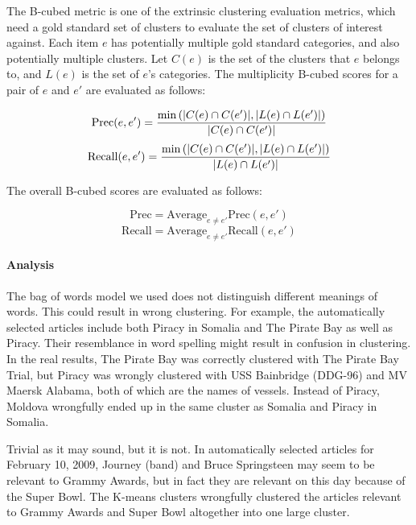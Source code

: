 \documentclass[11pt]{article}
\newcommand{\war}[1]{{\sf\small #1}}
\begin{document}
The B-cubed metric is one of the extrinsic clustering evaluation metrics, which need a gold standard set of clusters to evaluate the set of clusters of interest against.
Each item $e$ has potentially multiple gold standard categories, and also potentially multiple clusters.
Let $C(e)$ is the set of the clusters that $e$ belongs to, and $L(e)$ is the set of $e$'s categories.
The multiplicity B-cubed scores for a pair of $e$ and $e'$ are evaluated as follows:

$$ \mbox{Prec}(e,e') = { \min \left( |C(e) \cap C(e')| , |L(e) \cap L(e')| \right) \over |C(e) \cap C(e')| } $$
$$ \mbox{Recall}(e,e') = { \min \left( |C(e) \cap C(e')| , |L(e) \cap L(e')| \right) \over |L(e) \cap L(e')| } $$

The overall B-cubed scores are evaluated as follows:

$$ \mbox{Prec} = \mbox{Average} _{e \neq e'} \mbox{Prec}(e,e') $$
$$ \mbox{Recall} = \mbox{Average} _{e \neq e'} \mbox{Recall}(e,e') $$

\paragraph{Analysis}

The bag of words model we used does not distinguish different meanings of words. This could result in wrong clustering. For example, the automatically selected articles include both \war{Piracy in Somalia} and \war{The Pirate Bay} as well as \war{Piracy}. Their resemblance in word spelling might result in confusion in clustering.
In the real results, \war{The Pirate Bay} was correctly clustered with \war{The Pirate Bay Trial}, but \war{Piracy} was wrongly clustered with \war{USS Bainbridge (DDG-96)} and \war{MV Maersk Alabama}, both of which are the names of vessels. Instead of \war{Piracy}, \war{Moldova} wrongfully ended up in the same cluster as \war{Somalia} and \war{Piracy in Somalia}.

Trivial as it may sound, but it is not. In automatically selected articles for February 10, 2009, \war{Journey (band)} and \war{Bruce Springsteen} may seem to be relevant to \war{Grammy Awards}, but in fact they are relevant on this day because of the \war{Super Bowl}. The K-means clusters wrongfully clustered the articles relevant to \war{Grammy Awards} and \war{Super Bowl} altogether into one large cluster.
\end{document}
